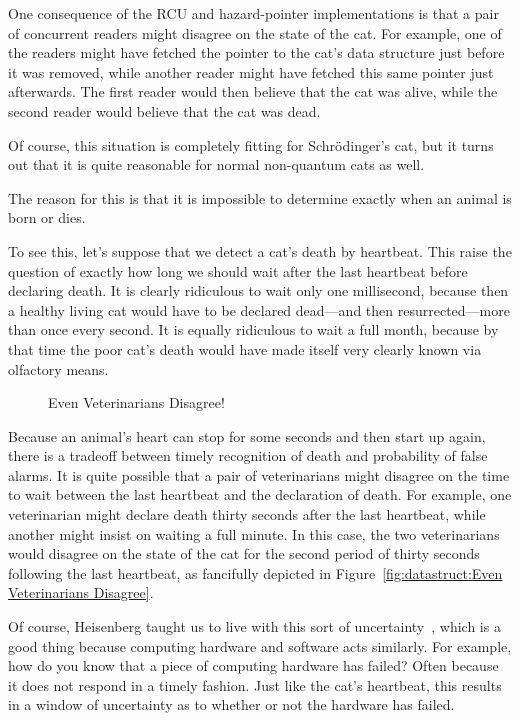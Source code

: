 One consequence of the RCU and hazard-pointer implementations is
that a pair of concurrent readers might disagree on the state of
the cat.
For example, one of the readers might have fetched the pointer to
the cat's data structure just before it was removed, while another
reader might have fetched this same pointer just afterwards.
The first reader would then believe that the cat was alive, while
the second reader would believe that the cat was dead.

Of course, this situation is completely fitting for Schr\"odinger's
cat, but it turns out that it is quite reasonable for normal
non-quantum cats as well.

The reason for this is that it is impossible to determine exactly
when an animal is born or dies.

To see this, let's suppose that we detect a cat's death by heartbeat.
This raise the question of exactly how long we should wait after the
last heartbeat before declaring death.
It is clearly ridiculous to wait only one millisecond, because then
a healthy living cat would have to be declared dead---and then
resurrected---more than once every second.
It is equally ridiculous to wait a full month, because by that time
the poor cat's death would have made itself very clearly known
via olfactory means.

\begin{figure}[tb]
\centering
{}
\caption{Even Veterinarians Disagree!}
\end{figure}

Because an animal's heart can stop for some seconds and then start up
again, there is a tradeoff between timely recognition of death and
probability of false alarms.
It is quite possible that a pair of veterinarians might disagree on
the time to wait between the last heartbeat and the declaration of
death.
For example, one veterinarian might declare death thirty seconds after
the last heartbeat, while another might insist on waiting a full
minute.
In this case, the two veterinarians would disagree on the state of the
cat for the second period of thirty seconds following the last heartbeat,
as fancifully depicted in
Figure~\ref{fig:datastruct:Even Veterinarians Disagree}.

Of course, Heisenberg taught us to live with this sort of
uncertainty~\cite{WeinerHeisenberg1927Uncertain}, which is a good
thing because computing hardware and software acts similarly.
For example, how do you know that a piece of computing hardware
has failed?
Often because it does not respond in a timely fashion.
Just like the cat's heartbeat, this results in a window of
uncertainty as to whether or not the hardware has failed.


